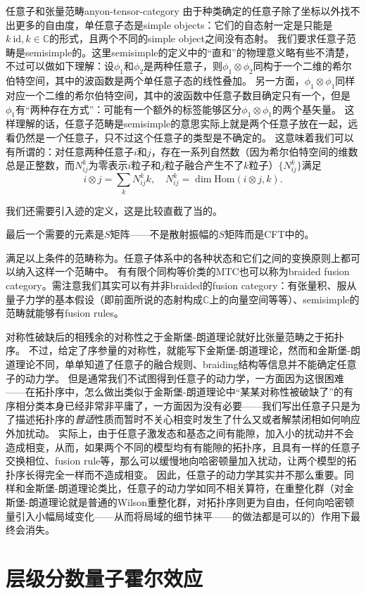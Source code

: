 \begin{back}{任意子和张量范畴}{anyon-tensor-category}
    由于种类确定的任意子除了坐标以外找不出更多的自由度，单任意子态是simple objects：它们的自态射一定是只能是$k \  \mathrm{id}, k \in \mathbb{C}$的形式，且两个不同的simple object之间没有态射。
    我们要求任意子范畴是semisimple的。这里semisimple的定义中的“直和”的物理意义略有些不清楚，不过可以做如下理解：设$\phi_1$和$\phi_2$是两种任意子，则$\phi_1 \otimes \phi_2$同构于一个二维的希尔伯特空间，其中的波函数是两个单任意子态的线性叠加。
    另一方面，$\phi_1 \otimes \phi_1$同样对应一个二维的希尔伯特空间，其中的波函数中任意子数目确定只有一个，但是$\phi_1$有“两种存在方式”：可能有一个额外的标签能够区分$\phi_1 \otimes \phi_1$的两个基矢量。
    这样理解的话，任意子范畴是semisimple的意思实际上就是两个任意子放在一起，远看仍然是\emph{一个}任意子，只不过这个任意子的类型是不确定的。
    这意味着我们可以有所谓的：对任意两种任意子$i$和$j$，存在一系列自然数（因为希尔伯特空间的维数总是正整数，而$N_{ij}^k$为零表示$i$粒子和$j$粒子融合产生不了$k$粒子）$\{N_{ij}^k\}$满足
    \begin{equation}
        i \otimes j = \sum_k N_{ij}^k k, \quad N_{ij}^k = \dim \mathrm{Hom}(i \otimes j, k).
    \end{equation}

    我们还需要引入迹的定义，这是比较直截了当的。

    最后一个需要的元素是$S$矩阵——不是散射振幅的$S$矩阵而是CFT中的。 %

    满足以上条件的范畴称为。任意子体系中的各种状态和它们之间的变换原则上都可以纳入这样一个范畴中。
    有有限个同构等价类的MTC也可以称为braided fusion category。需注意我们其实可以有并非braided的fusion category：有张量积、服从量子力学的基本假设（即前面所说的态射构成$\mathbb{C}$上的向量空间等等）、semisimple的范畴就能够有fusion rules。

    对称性破缺后的相残余的对称性之于金斯堡-朗道理论就好比张量范畴之于拓扑序。
    不过，给定了序参量的对称性，就能写下金斯堡-朗道理论，然而和金斯堡-朗道理论不同，单单知道了任意子的融合规则、braiding结构等信息并不能确定任意子的动力学。
    但是通常我们不试图得到任意子的动力学，一方面因为这很困难——在拓扑序中，怎么做出类似于金斯堡-朗道理论中“某某对称性被破缺了”的有序相分类本身已经非常非平庸了，一方面因为没有必要——我们写出任意子只是为了描述拓扑序的\emph{普适}性质而暂时不关心相变时发生了什么又或者解禁闭相如何响应外加扰动。
    实际上，由于任意子激发态和基态之间有能隙，加入小的扰动并不会造成相变，从而，如果两个不同的模型均有有能隙的拓扑序，且具有一样的任意子交换相位、fusion rule等，那么可以缓慢地向哈密顿量加入扰动，让两个模型的拓扑序长得完全一样而不造成相变。
    因此，任意子的动力学其实并不那么重要。同样和金斯堡-朗道理论类比，任意子的动力学如同不相关算符，在重整化群（对金斯堡-朗道理论就是普通的Wilson重整化群，对拓扑序则更为自由，任何向哈密顿量引入小幅局域变化——从而将局域的细节抹平——的做法都是可以的）作用下最终会消失。
\end{back}

\section{层级分数量子霍尔效应}